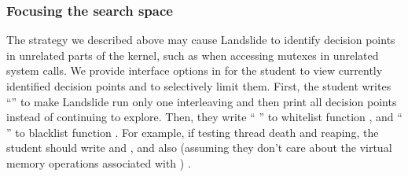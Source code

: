 \subsubsection{Focusing the search space}
\label{sec:focusing}

The strategy we described above may cause Landslide to identify decision points in unrelated parts of the kernel, such as when accessing mutexes in unrelated system calls.
We provide interface options in  for the student to view currently identified decision points and to selectively limit them.
First, the student writes ``'' to make Landslide run only one interleaving and then print all decision points instead of continuing to explore.
Then, they write `` '' to whitelist function , and `` '' to blacklist function .
For example, if testing thread death and reaping, the student should write  and  , and also
(assuming they don't care about the virtual memory operations associated with )
 .

%

